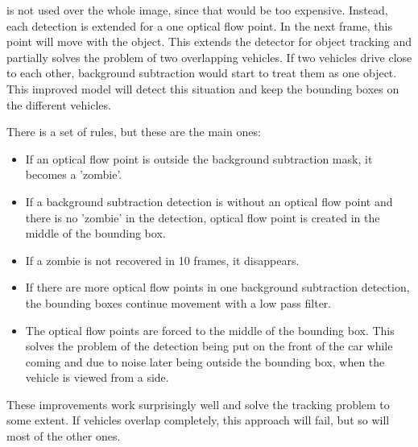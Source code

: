 \documentclass[a4paper,12pt,titlepage, twoside]{article}
\numberwithin{figure}{section}
\begin{document}
is not used over the whole image, since that would be too expensive. Instead, each detection is extended for a one optical flow point. In the next frame, this point will move with the object. This extends the detector for object tracking and partially solves the problem of two overlapping vehicles. If two vehicles drive close to each other, background subtraction would start to treat them as one object. This improved model will detect this situation and keep the bounding boxes on the different vehicles. 

There is a set of rules, but these are the main ones:
\begin{itemize}
	\item If an optical flow point is outside the background subtraction mask, it becomes a 'zombie'.
	\item If a background subtraction detection is without an optical flow point and there is no 'zombie' in the detection, optical flow point is created in the middle of the bounding box. 
	\item If a zombie is not recovered in 10 frames, it disappears. 
	\item If there are more optical flow points in one background subtraction detection, the bounding boxes continue movement with a low pass filter.
	\item The optical flow points are forced to the middle of the bounding box. This solves the problem of the detection being put on the front of the car while coming and due to noise later being outside the bounding box, when the vehicle is viewed from a side. 
\end{itemize}

These improvements work surprisingly well and solve the tracking problem to some extent. If vehicles overlap completely, this approach will fail, but so will most of the other ones. 











{}
\cleardoublepage
\clearpage
\end{document}
